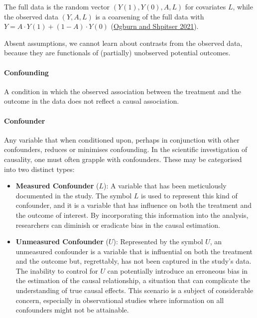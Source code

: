 \documentclass[
  singlecolumn]{article}
\let\oldparagraph\paragraph
\renewcommand{\paragraph}[1]{\oldparagraph{#1}\mbox{}}
\begin{document}
The full data is the random vector \((Y(1), Y(0), A, L)\) for covariates
\(L\), while the observed data \((Y, A, L)\) is a coarsening of the full
data with \(Y = A \cdot Y(1) + (1-A) \cdot Y(0)\)
(\hyperref[ref-ogburn2021]{Ogburn and Shpitser 2021}).

Absent assumptions, we cannot learn about contrasts from the observed
data, because they are functionals of (partially) unobserved potential
outcomes.

\paragraph{\texorpdfstring{\textbf{Confounding}}{Confounding}}\label{confounding}

A condition in which the observed association between the treatment and
the outcome in the data does not reflect a causal association.

\paragraph{\texorpdfstring{\textbf{Confounder}}{Confounder}}\label{confounder}

Any variable that when conditioned upon, perhaps in conjunction with
other confounders, reduces or minimises confounding. In the scientific
investigation of causality, one must often grapple with confounders.
These may be categorised into two distinct types:

\begin{itemize}
\item
  \textbf{Measured Confounder} (\(L\)): A variable that has been
  meticulously documented in the study. The symbol \(L\) is used to
  represent this kind of confounder, and it is a variable that has
  influence on both the treatment and the outcome of interest. By
  incorporating this information into the analysis, researchers can
  diminish or eradicate bias in the causal estimation.
\item
  \textbf{Unmeasured Confounder} (\(U\)): Represented by the symbol
  \(U\), an unmeasured confounder is a variable that is influential on
  both the treatment and the outcome but, regrettably, has not been
  captured in the study's data. The inability to control for \(U\) can
  potentially introduce an erroneous bias in the estimation of the
  causal relationship, a situation that can complicate the understanding
  of true causal effects. This scenario is a subject of considerable
  concern, especially in observational studies where information on all
  confounders might not be attainable.
\end{itemize}
\end{document}
